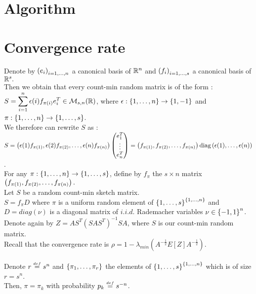 \section{Algorithm}


\section{Convergence rate}

Denote by $\left(e_{i}\right)_{i=1,\dots,n}$ a canonical basis of ${\mathbb R}^{n}$  and $\left(f_{i}\right)_{i=1,\dots,s}$ a canonical basis of ${\mathbb R}^{s}.$\\ 
Then we obtain that every count-min random matrix is of the form : \\
$\displaystyle S = \displaystyle\sum_{i=1}^{n} \displaystyle\epsilon(i) f_{\pi(i)}e_{i}^{T} \in {\mathcal M}_{s,n}({\mathbb R})$, where $\epsilon : \left\{1,\dots,n\right\} \rightarrow \left\{1,-1\right\}$ and $\pi : \left\{1,\dots,n\right\} \rightarrow \left\{1,\dots,s\right\} $.\\

We therefore can rewrite $S$ as :\\
 $S = \left( \epsilon(1)f_{\pi(1)},\epsilon(2)f_{\pi(2)},\dots,\epsilon(n)f_{\pi(n)} \right) \begin{pmatrix} e_{1}^{T} \\ \vdots \\ e_{n}^{T} \end{pmatrix} = \left( f_{\pi(1)}, f_{\pi(2)},\dots, f_{\pi(n)} \right) \text{diag}\left(\epsilon(1),\dots,\epsilon(n)\right)$.\\
 

For any $\pi : \left\{1,\dots,n\right\} \rightarrow \left\{1,\dots,s\right\} $, define by $f_{\pi}$ the $s\times n$ matrix $\left( f_{\pi(1)}, f_{\pi(2)},\dots, f_{\pi(n)} \right).$\\

Let $S$ be a random count-min sketch matrix.\\
 $S = f_{\pi} D$ where $\pi$ is a uniform random element of $\left\{1,\dots,s\right\}^{\left\{1,\dots,n\right\}}$ and $D = diag(\nu)$ is a diagonal matrix of $i.i.d.$ Rademacher variables $\nu \in \left\{-1,1\right\}^{n}$. \\

Denote again by $Z = A S^{T} (S A S^{T})^{-1} S A$, where $S$ is our count-min random matrix.\\
Recall that the convergence rate is  $\rho = 1 - \lambda_{min}(A^{-\frac12}E[Z]A^{-\frac12}  )$.\\\\

Denote $r \stackrel{{\scriptscriptstyle{def}}}{=} s^{n}$ and $\left\{\pi_{1},\dots,\pi_{r}\right\}$ the elements of $\left\{1,\dots,s\right\}^{\left\{1,\dots,n\right\}}$ which is of size $r = s^{n}$.\\
Then, $\pi = \pi_{k}$ with probability $p_{k} \stackrel{{\scriptscriptstyle{def}}}{=} s^{-n}$.\\

